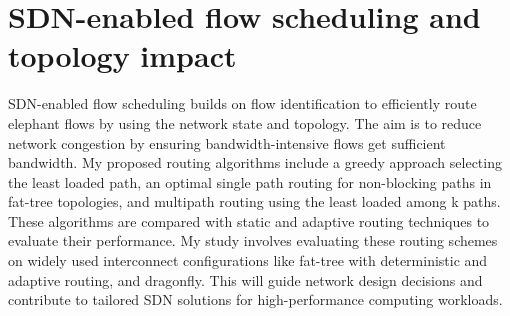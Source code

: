 \section{SDN-enabled flow scheduling and topology impact}
SDN-enabled flow scheduling builds on flow identification to efficiently route elephant flows by using the network state and topology. The aim is to reduce network congestion by ensuring bandwidth-intensive flows get sufficient bandwidth. My proposed routing algorithms include a greedy approach selecting the least loaded path, an optimal single path routing for non-blocking paths in fat-tree topologies, and multipath routing using the least loaded among k paths. These algorithms are compared with static and adaptive routing techniques to evaluate their performance.
My study involves evaluating these routing schemes on widely used interconnect configurations like fat-tree with deterministic and adaptive routing, and dragonfly. This will guide network design decisions and contribute to tailored SDN solutions for high-performance computing workloads.

